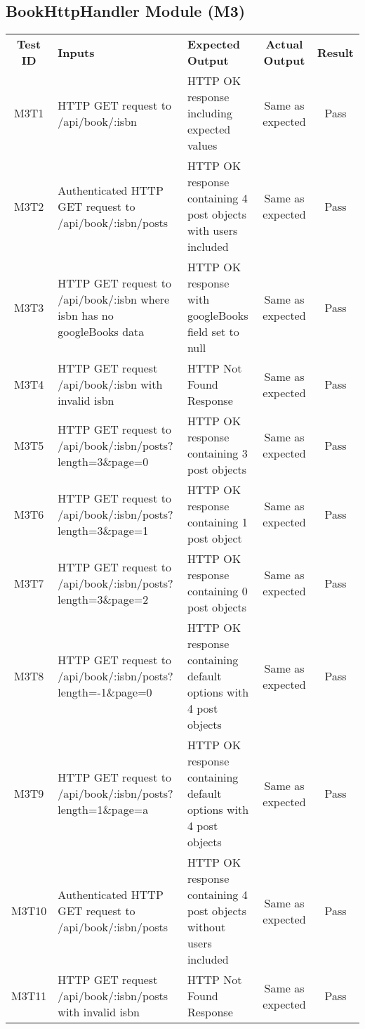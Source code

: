 \documentclass[fullpage]{article}
\begin{document}
\subsection{BookHttpHandler Module (M3)}
\begin{table}[H]
\flushleft
\begin{tabular}{|c|p{5.6cm}|p{3.6cm}|c|c|}
\hline
 \rowcolor{lightgray}
\textbf{Test ID} &\textbf{Inputs} &\textbf{Expected Output} &\textbf{Actual Output} &\textbf{Result}\\
M3T1 & HTTP GET request to /api/book/:isbn & HTTP OK response including expected values & Same as expected & Pass\\
\hline
M3T2 & Authenticated HTTP GET request to /api/book/:isbn/posts & HTTP OK response containing 4 post objects with users included & Same as expected & Pass\\
\hline
M3T3 & HTTP GET request to /api/book/:isbn where isbn has no googleBooks data & HTTP OK response with googleBooks field set to null & Same as expected & Pass\\
\hline
M3T4 & HTTP GET request /api/book/:isbn with invalid isbn & HTTP Not Found Response  & Same as expected & Pass\\
\hline
M3T5 & HTTP GET request to /api/book/:isbn/posts?length=3\&page=0 &  HTTP OK response containing 3 post objects & Same as expected & Pass\\
\hline
M3T6 & HTTP GET request to /api/book/:isbn/posts?length=3\&page=1 &  HTTP OK response containing 1 post object & Same as expected & Pass\\
\hline
M3T7 & HTTP GET request to /api/book/:isbn/posts?length=3\&page=2 &  HTTP OK response containing 0 post objects & Same as expected & Pass\\
\hline
M3T8 & HTTP GET request to /api/book/:isbn/posts?length=-1\&page=0 &  HTTP OK response containing default options with 4 post objects & Same as expected & Pass\\
\hline
M3T9 & HTTP GET request to /api/book/:isbn/posts?length=1\&page=a &  HTTP OK response containing default options with 4 post objects & Same as expected & Pass\\
\hline
M3T10 & Authenticated HTTP GET request to /api/book/:isbn/posts & HTTP OK response containing 4 post objects without users included & Same as expected & Pass\\
\hline
M3T11 & HTTP GET request /api/book/:isbn/posts with invalid isbn & HTTP Not Found Response  & Same as expected & Pass\\
\hline


\end{tabular}
\end{table}
\end{document}
